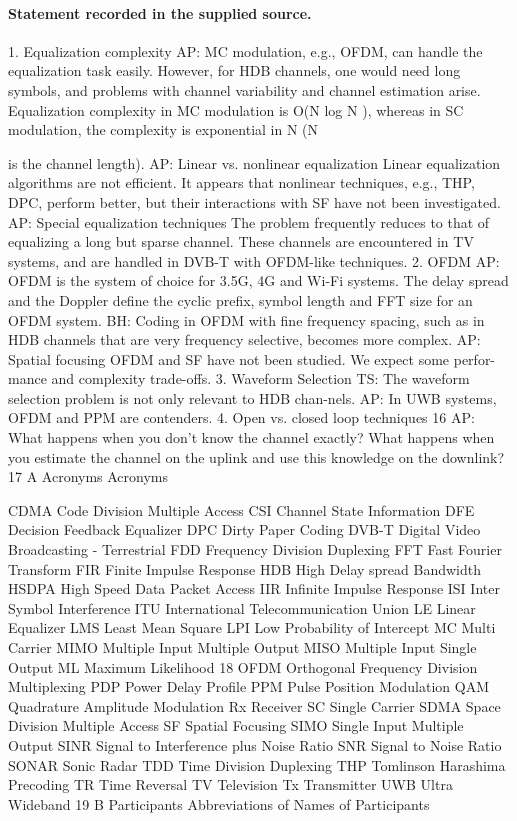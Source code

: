\documentclass[11pt]{article}
\begin{document}
\paragraph{Statement recorded in the supplied source.}
1. Equalization complexity AP: MC modulation, e.g., OFDM, can handle the equalization task easily. However, for HDB channels, one would need long symbols, and problems with channel variability and channel estimation arise. Equalization complexity in MC modulation is O(N log N ), whereas in SC modulation, the complexity is exponential in N (N

is the channel length). AP: Linear vs. nonlinear equalization Linear equalization algorithms are not efficient. It appears that nonlinear techniques, e.g., THP, DPC, perform better, but their interactions with SF have not been investigated. AP: Special equalization techniques The problem frequently reduces to that of equalizing a long but sparse channel. These channels are encountered in TV systems, and are handled in DVB-T with OFDM-like techniques. 2. OFDM AP: OFDM is the system of choice for 3.5G, 4G and Wi-Fi systems. The delay spread and the Doppler define the cyclic prefix, symbol length and FFT size for an OFDM system. BH: Coding in OFDM with fine frequency spacing, such as in HDB channels that are very frequency selective, becomes more complex. AP: Spatial focusing OFDM and SF have not been studied. We expect some perfor-mance and complexity trade-offs. 3. Waveform Selection TS: The waveform selection problem is not only relevant to HDB chan-nels. AP: In UWB systems, OFDM and PPM are contenders. 4. Open vs. closed loop techniques 16 AP: What happens when you don't know the channel exactly? What happens when you estimate the channel on the uplink and use this knowledge on the downlink? 17 A Acronyms Acronyms

CDMA Code Division Multiple Access CSI Channel State Information DFE Decision Feedback Equalizer DPC Dirty Paper Coding DVB-T Digital Video Broadcasting - Terrestrial FDD Frequency Division Duplexing FFT Fast Fourier Transform FIR Finite Impulse Response HDB High Delay spread Bandwidth HSDPA High Speed Data Packet Access IIR Infinite Impulse Response ISI Inter Symbol Interference ITU International Telecommunication Union LE Linear Equalizer LMS Least Mean Square LPI Low Probability of Intercept MC Multi Carrier MIMO Multiple Input Multiple Output MISO Multiple Input Single Output ML Maximum Likelihood 18 OFDM Orthogonal Frequency Division Multiplexing PDP Power Delay Profile PPM Pulse Position Modulation QAM Quadrature Amplitude Modulation Rx Receiver SC Single Carrier SDMA Space Division Multiple Access SF Spatial Focusing SIMO Single Input Multiple Output SINR Signal to Interference plus Noise Ratio SNR Signal to Noise Ratio SONAR Sonic Radar TDD Time Division Duplexing THP Tomlinson Harashima Precoding TR Time Reversal TV Television Tx Transmitter UWB Ultra Wideband 19 B Participants Abbreviations of Names of Participants
\end{document}
